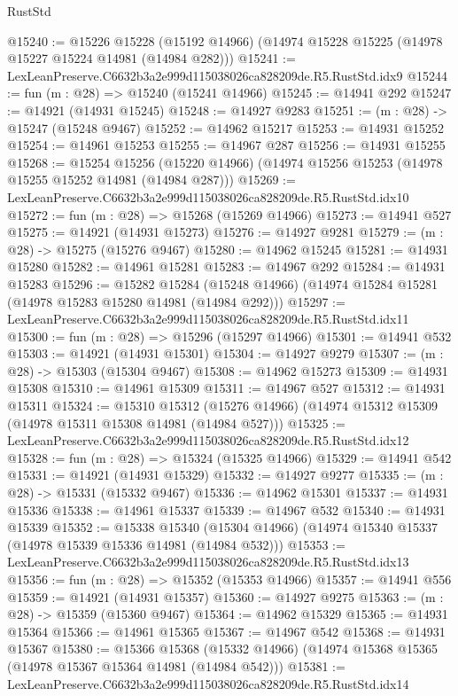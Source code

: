 \begin{lexlean}{RustStd}
\begin{coremodule}
@15240 := @15226
    @15228
    (@15192 @14966)
    (@14974 @15228 @15225 (@14978 @15227 @15224 @14981 (@14984 @282)))
@15241 := LexLeanPreserve.C6632b3a2e999d115038026ca828209de.R5.RustStd.idx9
@15244 := fun (m : @28) => @15240 (@15241 @14966)
@15245 := @14941 @292
@15247 := @14921 (@14931 @15245)
@15248 := @14927 @9283
@15251 := (m : @28) -> @15247 (@15248 @9467)
@15252 := @14962 @15217
@15253 := @14931 @15252
@15254 := @14961 @15253
@15255 := @14967 @287
@15256 := @14931 @15255
@15268 := @15254
    @15256
    (@15220 @14966)
    (@14974 @15256 @15253 (@14978 @15255 @15252 @14981 (@14984 @287)))
@15269 := LexLeanPreserve.C6632b3a2e999d115038026ca828209de.R5.RustStd.idx10
@15272 := fun (m : @28) => @15268 (@15269 @14966)
@15273 := @14941 @527
@15275 := @14921 (@14931 @15273)
@15276 := @14927 @9281
@15279 := (m : @28) -> @15275 (@15276 @9467)
@15280 := @14962 @15245
@15281 := @14931 @15280
@15282 := @14961 @15281
@15283 := @14967 @292
@15284 := @14931 @15283
@15296 := @15282
    @15284
    (@15248 @14966)
    (@14974 @15284 @15281 (@14978 @15283 @15280 @14981 (@14984 @292)))
@15297 := LexLeanPreserve.C6632b3a2e999d115038026ca828209de.R5.RustStd.idx11
@15300 := fun (m : @28) => @15296 (@15297 @14966)
@15301 := @14941 @532
@15303 := @14921 (@14931 @15301)
@15304 := @14927 @9279
@15307 := (m : @28) -> @15303 (@15304 @9467)
@15308 := @14962 @15273
@15309 := @14931 @15308
@15310 := @14961 @15309
@15311 := @14967 @527
@15312 := @14931 @15311
@15324 := @15310
    @15312
    (@15276 @14966)
    (@14974 @15312 @15309 (@14978 @15311 @15308 @14981 (@14984 @527)))
@15325 := LexLeanPreserve.C6632b3a2e999d115038026ca828209de.R5.RustStd.idx12
@15328 := fun (m : @28) => @15324 (@15325 @14966)
@15329 := @14941 @542
@15331 := @14921 (@14931 @15329)
@15332 := @14927 @9277
@15335 := (m : @28) -> @15331 (@15332 @9467)
@15336 := @14962 @15301
@15337 := @14931 @15336
@15338 := @14961 @15337
@15339 := @14967 @532
@15340 := @14931 @15339
@15352 := @15338
    @15340
    (@15304 @14966)
    (@14974 @15340 @15337 (@14978 @15339 @15336 @14981 (@14984 @532)))
@15353 := LexLeanPreserve.C6632b3a2e999d115038026ca828209de.R5.RustStd.idx13
@15356 := fun (m : @28) => @15352 (@15353 @14966)
@15357 := @14941 @556
@15359 := @14921 (@14931 @15357)
@15360 := @14927 @9275
@15363 := (m : @28) -> @15359 (@15360 @9467)
@15364 := @14962 @15329
@15365 := @14931 @15364
@15366 := @14961 @15365
@15367 := @14967 @542
@15368 := @14931 @15367
@15380 := @15366
    @15368
    (@15332 @14966)
    (@14974 @15368 @15365 (@14978 @15367 @15364 @14981 (@14984 @542)))
@15381 := LexLeanPreserve.C6632b3a2e999d115038026ca828209de.R5.RustStd.idx14

\end{coremodule}
\end{lexlean}
